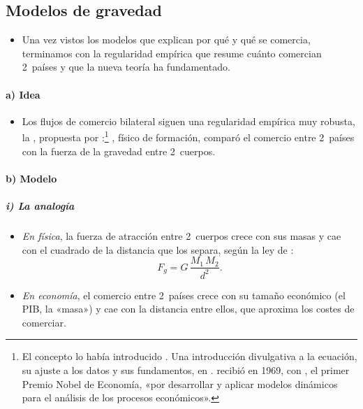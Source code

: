 \documentclass[11pt]{article}
\begin{document}
\subsection{Modelos de gravedad}\label{sec:gravedad}

\begin{itemize}
\item Una vez vistos los modelos que explican por qué y qué se comercia, terminamos con la regularidad empírica que resume cuánto comercian 2~países y que la nueva teoría ha fundamentado.
\end{itemize}

\paragraph{a) Idea}

\begin{itemize}
\item Los flujos de comercio bilateral siguen una regularidad empírica muy robusta, la , propuesta por \textcite{Tinbergen1962Shaping}:\footnote{El concepto lo había introducido \textcite{Isard1954Location}. Una introducción divulgativa a la ecuación, su ajuste a los datos y sus fundamentos, en \textcite{Moran2020Gravity}.  recibió en 1969, con , el primer Premio Nobel de Economía, «por desarrollar y aplicar modelos dinámicos para el análisis de los procesos económicos»\nocite{Nobel1969}.} , físico de formación, comparó el comercio entre 2~países con la fuerza de la gravedad entre 2~cuerpos.
\end{itemize}

\paragraph{b) Modelo}

\subparagraph{i) La analogía}

\begin{itemize}
\item \emph{En física}, la fuerza de atracción entre 2~cuerpos crece con sus masas y cae con el cuadrado de la distancia que los separa, según la ley de :
  $$F_g=G\,\frac{M_1\,M_2}{d^{2}}.$$
\item \emph{En economía}, el comercio entre 2~países crece con su tamaño económico (el PIB, la «masa») y cae con la distancia entre ellos, que aproxima los costes de comerciar.
\end{itemize}
\end{document}
